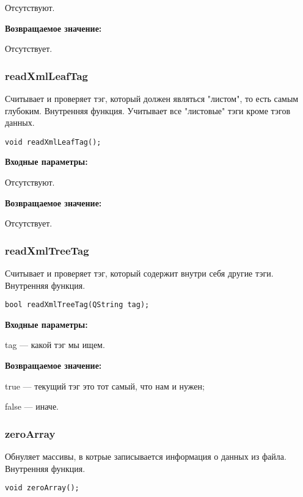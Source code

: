 \documentclass[a4paper,12pt]{article}
\begin{document}
Отсутствуют.

\textbf{Возвращаемое значение:}

Отсутствует.


\subsubsection{readXmlLeafTag}\label{readXmlLeafTag}

Считывает и проверяет тэг, который должен являться "листом", то есть самым глубоким. Внутренняя функция. Учитывает все "листовые" тэги кроме тэгов данных.


\begin{lstlisting}[label=code_syntax_readXmlLeafTag,caption=Синтаксис]
void readXmlLeafTag();
\end{lstlisting}

\textbf{Входные параметры:}

Отсутствуют.

\textbf{Возвращаемое значение:}

Отсутствует.


\subsubsection{readXmlTreeTag}\label{readXmlTreeTag}

Считывает и проверяет тэг, который содержит внутри себя другие тэги. Внутренняя функция.


\begin{lstlisting}[label=code_syntax_readXmlTreeTag,caption=Синтаксис]
bool readXmlTreeTag(QString tag);
\end{lstlisting}

\textbf{Входные параметры:}

tag --- какой тэг мы ищем.

\textbf{Возвращаемое значение:}

 
    true --- текущий тэг это тот самый, что нам и нужен;
 
    false --- иначе.


\subsubsection{zeroArray}\label{zeroArray}

Обнуляет массивы, в котрые записывается информация о данных из файла. Внутренняя функция.


\begin{lstlisting}[label=code_syntax_zeroArray,caption=Синтаксис]
void zeroArray();
\end{lstlisting}
\end{document}
